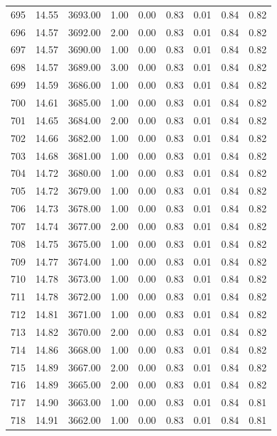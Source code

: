 \documentclass{article}\usepackage[]{graphicx}\usepackage[]{color}
\begin{document}
\begin{longtable}{rrrrrrrrr}
  695 & 14.55 & 3693.00 & 1.00 & 0.00 & 0.83 & 0.01 & 0.84 & 0.82 \\ 
  696 & 14.57 & 3692.00 & 2.00 & 0.00 & 0.83 & 0.01 & 0.84 & 0.82 \\ 
  697 & 14.57 & 3690.00 & 1.00 & 0.00 & 0.83 & 0.01 & 0.84 & 0.82 \\ 
  698 & 14.57 & 3689.00 & 3.00 & 0.00 & 0.83 & 0.01 & 0.84 & 0.82 \\ 
  699 & 14.59 & 3686.00 & 1.00 & 0.00 & 0.83 & 0.01 & 0.84 & 0.82 \\ 
  700 & 14.61 & 3685.00 & 1.00 & 0.00 & 0.83 & 0.01 & 0.84 & 0.82 \\ 
  701 & 14.65 & 3684.00 & 2.00 & 0.00 & 0.83 & 0.01 & 0.84 & 0.82 \\ 
  702 & 14.66 & 3682.00 & 1.00 & 0.00 & 0.83 & 0.01 & 0.84 & 0.82 \\ 
  703 & 14.68 & 3681.00 & 1.00 & 0.00 & 0.83 & 0.01 & 0.84 & 0.82 \\ 
  704 & 14.72 & 3680.00 & 1.00 & 0.00 & 0.83 & 0.01 & 0.84 & 0.82 \\ 
  705 & 14.72 & 3679.00 & 1.00 & 0.00 & 0.83 & 0.01 & 0.84 & 0.82 \\ 
  706 & 14.73 & 3678.00 & 1.00 & 0.00 & 0.83 & 0.01 & 0.84 & 0.82 \\ 
  707 & 14.74 & 3677.00 & 2.00 & 0.00 & 0.83 & 0.01 & 0.84 & 0.82 \\ 
  708 & 14.75 & 3675.00 & 1.00 & 0.00 & 0.83 & 0.01 & 0.84 & 0.82 \\ 
  709 & 14.77 & 3674.00 & 1.00 & 0.00 & 0.83 & 0.01 & 0.84 & 0.82 \\ 
  710 & 14.78 & 3673.00 & 1.00 & 0.00 & 0.83 & 0.01 & 0.84 & 0.82 \\ 
  711 & 14.78 & 3672.00 & 1.00 & 0.00 & 0.83 & 0.01 & 0.84 & 0.82 \\ 
  712 & 14.81 & 3671.00 & 1.00 & 0.00 & 0.83 & 0.01 & 0.84 & 0.82 \\ 
  713 & 14.82 & 3670.00 & 2.00 & 0.00 & 0.83 & 0.01 & 0.84 & 0.82 \\ 
  714 & 14.86 & 3668.00 & 1.00 & 0.00 & 0.83 & 0.01 & 0.84 & 0.82 \\ 
  715 & 14.89 & 3667.00 & 2.00 & 0.00 & 0.83 & 0.01 & 0.84 & 0.82 \\ 
  716 & 14.89 & 3665.00 & 2.00 & 0.00 & 0.83 & 0.01 & 0.84 & 0.82 \\ 
  717 & 14.90 & 3663.00 & 1.00 & 0.00 & 0.83 & 0.01 & 0.84 & 0.81 \\ 
  718 & 14.91 & 3662.00 & 1.00 & 0.00 & 0.83 & 0.01 & 0.84 & 0.81 \\ 

\end{longtable}
\end{document}
